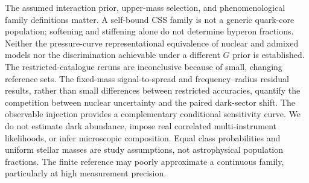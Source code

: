 \documentclass[11pt,a4paper]{article}
\begin{document}
The assumed interaction prior, upper-mass selection, and phenomenological family definitions matter. A self-bound CSS family is not a generic quark-core population; softening and stiffening alone do not determine hyperon fractions. Neither the pressure-curve representational equivalence of nuclear and admixed models nor the discrimination achievable under a different $G$ prior is established. The restricted-catalogue reruns are inconclusive because of small, changing reference sets. The fixed-mass signal-to-spread and frequency--radius residual results, rather than small differences between restricted accuracies, quantify the competition between nuclear uncertainty and the paired dark-sector shift. The observable injection provides a complementary conditional sensitivity curve. We do not estimate dark abundance, impose real correlated multi-instrument likelihoods, or infer microscopic composition. Equal class probabilities and uniform stellar masses are study assumptions, not astrophysical population fractions. The finite reference may poorly approximate a continuous family, particularly at high measurement precision.
\end{document}
